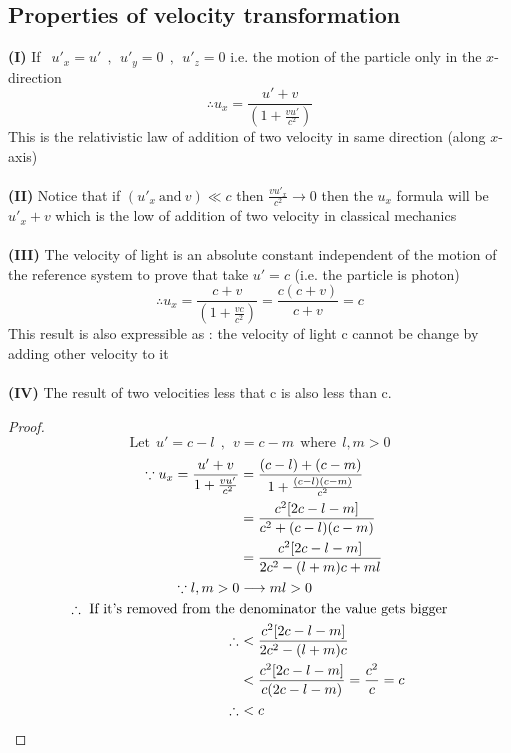\subsection{Properties of velocity transformation}
\textbf{(I)} If $\ \ u'_x = u' \ \ ,\ \ u'_y = 0 \ \ , \ \ u'_z = 0$ i.e. the motion of the particle only in the $x$-direction
\[
\therefore   u_x = \frac{u' + v}{\left(1 + \frac{vu'}{c^2}\right)}
\]
This is the relativistic law of addition of two velocity in same direction (along $x$-axis)
\\\\\textbf{(II)} Notice that if $(u'_x \ \text{and} \ v) \ll c$ then $\frac{vu'_x}{c^2} \to 0$ then the $u_x$ formula will be $u'_x + v$ which is the low of addition of two velocity in classical mechanics
\\\\\textbf{(III)} The velocity of light is an absolute constant independent of the motion of the reference system to prove that take $u' = c$ (i.e. the particle is photon)
\[
\therefore u_x =  \frac{c + v}{\left(1 + \frac{vc}{c^2}\right)} = \frac{c(c+v)}{c+v} = c
\]
This result is also expressible as : the velocity of light c cannot be change by adding other velocity to it 
\\\\\textbf{(IV)} The result of two velocities less that c is also less than c.
\begin{proof}
    \[
        \text{Let} \ \ u'=c-l \ \ , \ \ v=c-m \ \ \text{where} \ \ l,m>0
        \]
        \begin{align*}
            \because u_x = \frac{u' + v}{1 + \frac{vu'}{c^2}} &= \frac{(c-l) + (c-m)}{1 + \frac{(c-l)(c-m)}{c^2}}\\
                                                              &=\frac{c^2[2c-l-m]}{c^2+(c-l)(c-m)}\\
                                                              &=\frac{c^2[2c-l-m]}{2c^2-(l+m)c + ml}\\
                               \because l,m>0& \longrightarrow ml>0\\ 
                             \therefore \text{ If it's removed from the }&\text{denominator the value gets bigger}\\
                                                              &\hspace{-.35cm} \therefore \  <\frac{c^2[2c-l-m]}{2c^2-(l+m)c}\\
                                                              &<\frac{c^2[2c-l-m]}{c(2c-l-m)} = \frac{c^2}{c} = c\\
                                                              &\hspace{-.35cm} \therefore \  <c
        \end{align*}    
\end{proof}

